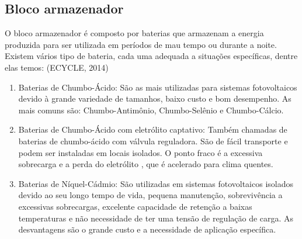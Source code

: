 \subsection{Bloco armazenador}
O bloco armazenador é composto por baterias que armazenam a energia produzida para ser utilizada em períodos de mau tempo ou durante a noite. Existem vários tipo de bateria, cada uma adequada a situações específicas, dentre elas temos: (ECYCLE, 2014)

\begin{enumerate}
\item Baterias de Chumbo-Ácido: São as mais utilizadas para sistemas fotovoltaicos devido à grande variedade de tamanhos, baixo custo e bom desempenho. As mais comuns são: Chumbo-Antimônio, Chumbo-Selênio e Chumbo-Cálcio.
\item Baterias de Chumbo-Ácido com eletrólito captativo: Também chamadas de baterias de chumbo-ácido com válvula reguladora. São de fácil transporte e podem ser instaladas em locais isolados. O ponto fraco é a excessiva sobrecarga e a perda do eletrólito , que é acelerado para clima quentes.
\item Baterias de Níquel-Cádmio:  São utilizadas em sistemas fotovoltaicos isolados devido ao seu longo tempo de vida, pequena manutenção, sobrevivência a excessivas sobrecargas, excelente capacidade de retenção a baixas temperaturas e não necessidade de ter uma tensão de regulação de carga. As desvantagens são o grande custo e a necessidade de aplicação específica. 
\end{enumerate}

